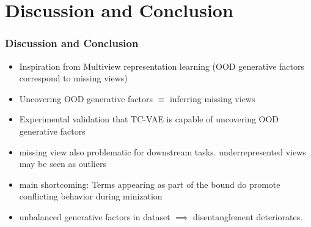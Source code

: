 \documentclass{beamer}
\theoremstyle{definition}
\begin{document}
  \section{Discussion and Conclusion}
    \begin{frame}
      \frametitle{Discussion and Conclusion}
      \begin{itemize}
        \item Inspiration from Multiview representation learning (OOD generative factors correspond to missing views)
        \item Uncovering OOD generative factors $\equiv$ inferring missing views
        \item Experimental validation that TC-VAE is capable of uncovering OOD generative factors
        \item missing view also problematic for downstream tasks. underrepresented views may be seen as outliers
        \item main shortcoming: Terms appearing as part of the bound do promote conflicting behavior during minization
        \item unbalanced generative factors in dataset $\implies$ disentanglement deteriorates.
      \end{itemize}
    \end{frame}
\end{document}
